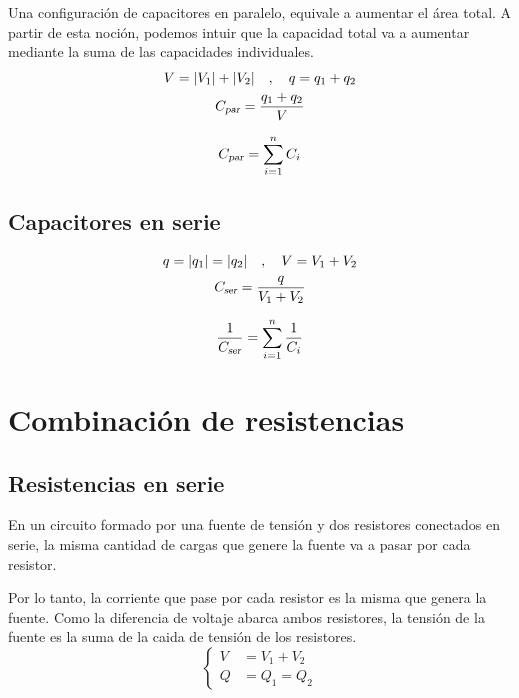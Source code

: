 \documentclass[a5paper,12pt,twoside]{book}
\begin{document}
Una configuración de capacitores en paralelo, equivale a aumentar el área total. A partir de esta noción, podemos intuir que la capacidad total va a aumentar mediante la suma de las capacidades individuales.
\begin{gather*}
    V = {\left| {V_1} \right|} + {\left| {V_2} \right|} \quad , \quad q = q_1 + q_2
    \\
    {{C}_\textsl{{par}}} = \frac{q_1 + q_2}{V}
\end{gather*}

\begin{equation*}
    {{C}_\textsl{{par}}} = \sum_{i=1}^n C_i
\end{equation*}


\subsection*{Capacitores en serie}

\begin{gather*}
    q = {\left| {q_1} \right|} = {\left| {q_2} \right|} \quad , \quad V = V_1 + V_2
    \\
    {{C}_\textsl{{ser}}} = \frac{q}{V_1 + V_2}
\end{gather*}

\begin{equation*}
    \frac{1}{{{C}_\textsl{{ser}}}} = \sum_{i=1}^n \frac{1}{C_i}
\end{equation*}


\section{Combinación de resistencias}


\subsection*{Resistencias en serie}

En un circuito formado por una fuente de tensión y dos resistores conectados en serie, la misma cantidad de cargas que genere la fuente va a pasar por cada resistor.

\begin{center}
    \def\svgwidth{0.5\linewidth}
    
\end{center}

Por lo tanto, la corriente que pase por cada resistor es la misma que genera la fuente. Como la diferencia de voltaje abarca ambos resistores, la tensión de la fuente es la suma de la caida de tensión de los resistores.
\begin{equation*}
    \left\{
    \begin{aligned}
        V &= V_1 + V_2
        \\
        Q &= Q_1 = Q_2
    \end{aligned}
    \right.
\end{equation*}
\end{document}
